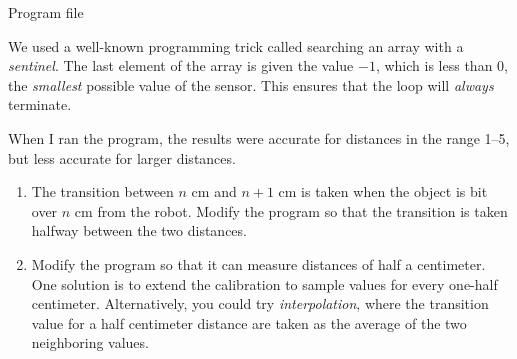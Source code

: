 
{\raggedleft \hfill Program file }

We used a well-known programming trick called searching an array with a
\emph{sentinel}. The last element of the array is given the value $-1$,
which is less than $0$, the \emph{smallest} possible value of the
sensor. This ensures that the loop will \emph{always} terminate.


When I ran the program, the results were accurate for distances in the
range 1--5, but less accurate for larger distances.


\begin{enumerate}

\item The transition between $n$ cm and $n+1$ cm is taken when the
object is bit over $n$ cm from the robot. Modify the program so that
the transition is taken halfway between the two distances.

\item Modify the program so that it can measure distances of half a
centimeter. One solution is to extend the calibration to sample values
for every one-half centimeter. Alternatively, you could try
\emph{interpolation}, where the transition value for a half centimeter
distance are taken as the average of the two neighboring values.

\end{enumerate}
